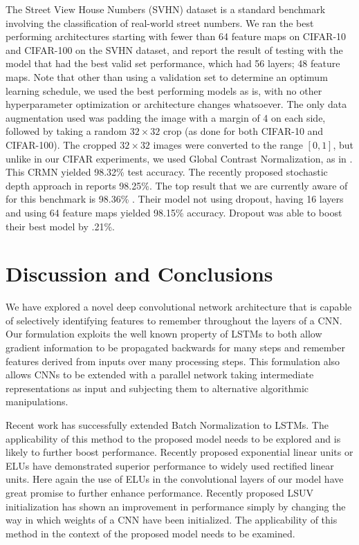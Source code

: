 \documentclass{article}
\begin{document}
The Street View House Numbers\cite{netzer2011reading} (SVHN) dataset is a standard benchmark involving the classification of real-world street numbers.  We ran the best performing architectures starting with fewer than 64 feature maps on CIFAR-10 and CIFAR-100 on the SVHN dataset, and report the result of testing with the model that had the best valid set performance, which had 56 layers; 48 feature maps. Note that other than using a validation set to determine an optimum learning schedule, we used the best performing models as is, with no other hyperparameter optimization or architecture changes whatsoever.
The only data augmentation used was padding the image with a margin of 4 on each side, followed by taking a random \(32\times32\) crop (as done for both CIFAR-10 and CIFAR-100). The cropped \(32\times32\) images were converted to the range \([0, 1]\), but unlike in our CIFAR experiments, we used Global Contrast Normalization, as in \cite{goodfellow2013multi}. This CRMN yielded 98.32\% test accuracy.
The recently proposed stochastic depth approach in \cite{huang2016deep} reports %
98.25\%.
The top result that we are currently aware of for this benchmark is 98.36\% \cite{zagoruyko2016wide}. Their model not using dropout, having 16 layers and using 64 feature maps yielded 98.15\% accuracy. Dropout was able to boost their best model by .21\%.

\section{Discussion and Conclusions}

We have explored a novel deep convolutional network architecture that is capable of selectively identifying features to remember throughout the layers of a CNN. Our formulation exploits the well known property of LSTMs to both allow gradient information to be propagated backwards for many steps and remember features derived from inputs over many processing steps. This formulation also allows CNNs to be extended with a parallel network taking intermediate representations as input and subjecting them to alternative algorithmic manipulations. 

Recent work \cite{DBLP:journals/corr/CooijmansBLC16} has successfully extended Batch Normalization to LSTMs. The applicability of this method to the proposed model needs to be explored and is likely to further boost performance.
%
Recently proposed exponential linear units or ELUs \cite{clevert2015fast} have demonstrated superior performance to widely used rectified linear units. Here again the use of ELUs in the convolutional layers of our model have great promise to further enhance performance.
%
Recently proposed LSUV initialization \cite{DBLP:journals/corr/MishkinM15} has shown an improvement in performance simply by changing the way in which weights of a CNN have been initialized. The applicability of this method in the context of the proposed model needs to be examined.
\end{document}
